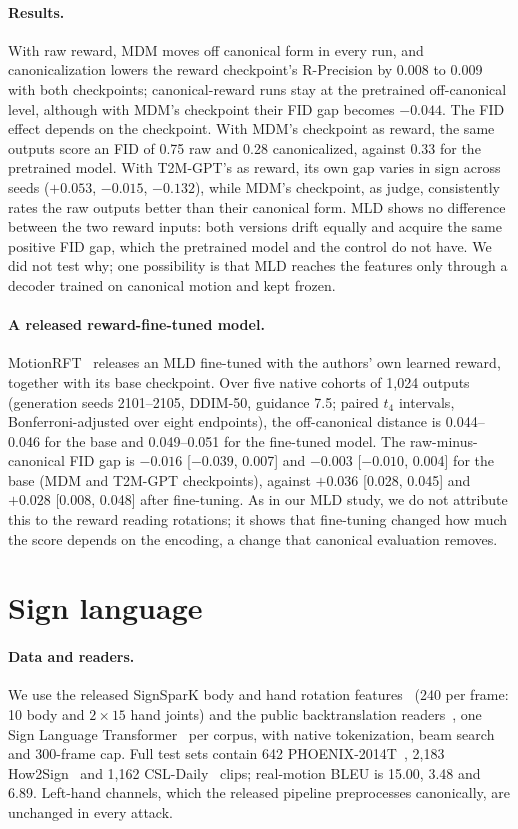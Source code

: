 \documentclass[10pt,twocolumn,letterpaper]{article}
\begin{document}


\paragraph{Results.} With raw reward, MDM moves off canonical form in every run, and canonicalization lowers the reward checkpoint's R-Precision by 0.008 to 0.009 with both checkpoints; canonical-reward runs stay at the pretrained off-canonical level, although with MDM's checkpoint their FID gap becomes $-0.044$. The FID effect depends on the checkpoint. With MDM's checkpoint as reward, the same outputs score an FID of 0.75 raw and 0.28 canonicalized, against 0.33 for the pretrained model. With T2M-GPT's as reward, its own gap varies in sign across seeds ($+0.053$, $-0.015$, $-0.132$), while MDM's checkpoint, as judge, consistently rates the raw outputs better than their canonical form. MLD shows no difference between the two reward inputs: both versions drift equally and acquire the same positive FID gap, which the pretrained model and the control do not have. We did not test why; one possibility is that MLD reaches the features only through a decoder trained on canonical motion and kept frozen.

\paragraph{A released reward-fine-tuned model.} MotionRFT~\cite{motionrft2026} releases an MLD fine-tuned with the authors' own learned reward, together with its base checkpoint. Over five native cohorts of 1,024 outputs (generation seeds 2101--2105, DDIM-50, guidance 7.5; paired $t_4$ intervals, Bonferroni-adjusted over eight endpoints), the off-canonical distance is 0.044--0.046 for the base and 0.049--0.051 for the fine-tuned model. The raw-minus-canonical FID gap is $-0.016$ [$-0.039$, 0.007] and $-0.003$ [$-0.010$, 0.004] for the base (MDM and T2M-GPT checkpoints), against $+0.036$ [0.028, 0.045] and $+0.028$ [0.008, 0.048] after fine-tuning. As in our MLD study, we do not attribute this to the reward reading rotations; it shows that fine-tuning changed how much the score depends on the encoding, a change that canonical evaluation removes.

\section{Sign language}\label{sec:sign}
\paragraph{Data and readers.} We use the released SignSparK body and hand rotation features~\cite{low2026} (240 per frame: 10 body and $2\times15$ hand joints) and the public backtranslation readers~\cite{signsparkbt}, one Sign Language Transformer~\cite{camgoz2020} per corpus, with native tokenization, beam search and 300-frame cap. Full test sets contain 642 PHOENIX-2014T~\cite{camgoz2018}, 2,183 How2Sign~\cite{duarte2021} and 1,162 CSL-Daily~\cite{zhou2021} clips; real-motion BLEU is 15.00, 3.48 and 6.89. Left-hand channels, which the released pipeline preprocesses canonically, are unchanged in every attack.
\end{document}
